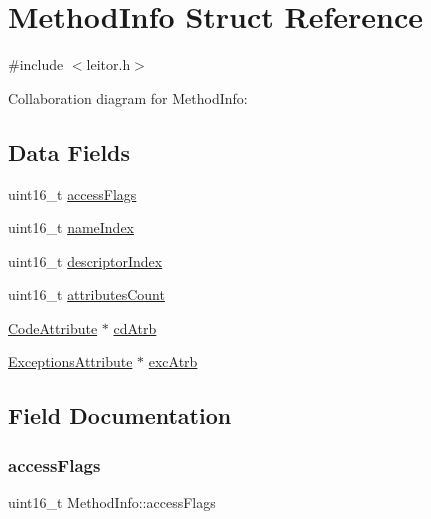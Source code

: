 \hypertarget{structMethodInfo}{}\section{Method\+Info Struct Reference}
\label{structMethodInfo}


{\ttfamily \#include $<$leitor.\+h$>$}



Collaboration diagram for Method\+Info\+:
\subsection*{Data Fields}
\begin{DoxyCompactItemize}
\item 
uint16\+\_\+t \hyperlink{structMethodInfo_a1075fd2ba433b27d9b04dec3a78de9f3}{access\+Flags}
\item 
uint16\+\_\+t \hyperlink{structMethodInfo_a946349e82f47156b63c58e57061d6891}{name\+Index}
\item 
uint16\+\_\+t \hyperlink{structMethodInfo_a4be51921e4147d189cc314b9b3a75161}{descriptor\+Index}
\item 
uint16\+\_\+t \hyperlink{structMethodInfo_a0980de52cac7b97181222b39b28e0fe0}{attributes\+Count}
\item 
\hyperlink{structCodeAttribute}{Code\+Attribute} $\ast$ \hyperlink{structMethodInfo_a6e5b903a4ae8fdf418b3955b93ded1c4}{cd\+Atrb}
\item 
\hyperlink{structExceptionsAttribute}{Exceptions\+Attribute} $\ast$ \hyperlink{structMethodInfo_ae09864e7cbb1f6423209b89a1ecb70a8}{exc\+Atrb}
\end{DoxyCompactItemize}


\subsection{Field Documentation}
\mbox{\label{structMethodInfo_a1075fd2ba433b27d9b04dec3a78de9f3}} 
\subsubsection{\texorpdfstring{access\+Flags}{accessFlags}}
{\footnotesize\ttfamily uint16\+\_\+t Method\+Info\+::access\+Flags}

\mbox{\label{structMethodInfo_a0980de52cac7b97181222b39b28e0fe0}} 
